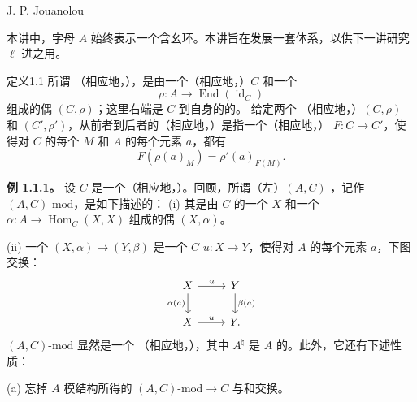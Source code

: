 \begin{center}J. P. Jouanolou\end{center}
本讲中，字母 $A$ 始终表示一个含幺环。本讲旨在发展一套体系，以供下一讲研究 $\ell$ 进之用。
\begin{SGAresult}{定义}{1.1}
所谓 （相应地，），是由一个（相应地，）$C$ 和一个
\[
\rho:A\longrightarrow\operatorname{End}(\operatorname{id}_C)
\]
组成的偶 $(C,\rho)$；这里右端是 $C$ 到自身的的。
给定两个 （相应地，）$(C,\rho)$ 和 $(C',\rho')$，从前者到后者的（相应地，）是指一个（相应地，） $F:C\to C'$，使得对 $C$ 的每个 $M$ 和 $A$ 的每个元素 $a$，都有
\[
F(\rho(a)_M)=\rho'(a)_{F(M)}.
\]
\end{SGAresult}
\textbf{例 1.1.1。} 设 $C$ 是一个（相应地，）。回顾，所谓（左）$(A,C)$ ，记作 $(A,C)\text{-}\mathrm{mod}$，是如下描述的：
(i) 其是由 $C$ 的一个 $X$ 和一个 $\alpha:A\to\operatorname{Hom}_C(X,X)$ 组成的偶 $(X,\alpha)$。

(ii) 一个 $(X,\alpha)\to(Y,\beta)$ 是一个 $C$  $u:X\to Y$，使得对 $A$ 的每个元素 $a$，下图交换：
\[
\begin{tikzcd}X\arrow[r,"u"]\arrow[d,"\alpha(a)"']&Y\arrow[d,"\beta(a)"]\\X\arrow[r,"u"]&Y.\end{tikzcd}
\]
 $(A,C)\text{-}\mathrm{mod}$ 显然是一个 （相应地，），其中 $A^\natural$ 是 $A$ 的。此外，它还有下述性质：

(a) 忘掉 $A$ 模结构所得的 $(A,C)\text{-}\mathrm{mod}\to C$ 与和交换。


